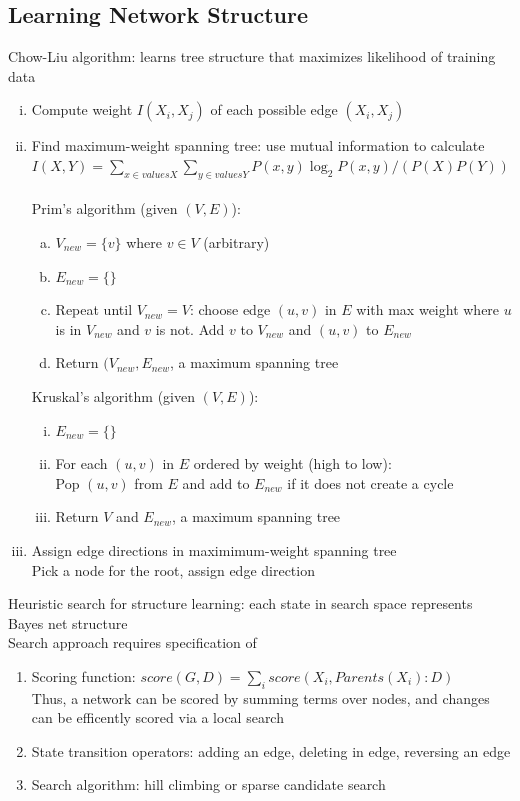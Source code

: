\documentclass{article}
\begin{document}
		\subsection{Learning Network Structure}
			Chow-Liu algorithm: learns tree structure that maximizes likelihood of training data
			\begin{enumerate}[(i)]
				\item Compute weight $I(X_i, X_j)$ of each possible edge $(X_i, X_j)$
				\item Find maximum-weight spanning tree: use mutual information to calculate \\
				$I(X, Y) = \sum_{x \in values{X}}\sum_{y \in values{Y}} P(x, y)\log_2 P(x, y)/(P(X)P(Y))$ \\
				\\
				Prim's algorithm (given $(V, E)$):
				\begin{enumerate}[(a)]
					\item $V_{new} = \{v\}$ where $v \in V$ (arbitrary)
					\item $E_{new} = \{\}$
					\item Repeat until $V_{new} = V$: choose edge $(u, v)$ in $E$ with max weight where $u$ is in $V_{new}$ and $v$ is not. Add $v$ to $V_{new}$ and $(u, v)$ to $E_{new}$
					\item Return $(V_{new}, E_{new}$, a maximum spanning tree
					\end{enumerate}
				Kruskal's algorithm (given $(V, E)$):
				\begin{enumerate}[(i)]
					\item $E_{new} = \{\}$
					\item For each $(u, v)$ in $E$ ordered by weight (high to low): \\
					Pop $(u, v)$ from $E$ and add to $E_{new}$ if it does not create a cycle
					\item Return $V$ and $E_{new}$, a maximum spanning tree
					\end{enumerate}
				\item Assign edge directions in maximimum-weight spanning tree \\
				Pick a node for the root, assign edge direction
				\end{enumerate}
			Heuristic search for structure learning: each state in search space represents Bayes net structure \\
			Search approach requires specification of
			\begin{enumerate}
				\item Scoring function: $score(G, D) = \sum_i score(X_i, Parents(X_i):D)$ \\
				Thus, a network can be scored by summing terms over nodes, and changes can be efficently scored via a local search
				\item State transition operators: adding an edge, deleting in edge, reversing an edge
				\item Search algorithm: hill climbing or sparse candidate search
				\end{enumerate}
\end{document}

